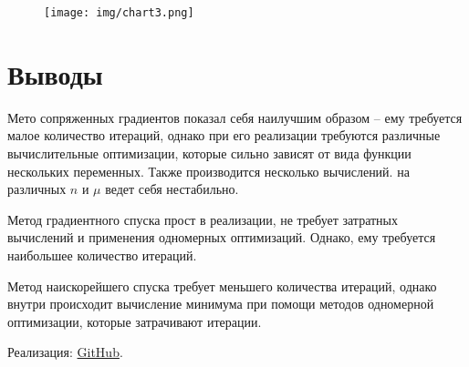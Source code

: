 \documentclass[12pt]{article}
\begin{document}
\begin{figure}[h]
	\centering
	\texttt{[image: img/chart3.png]}
\end{figure}

\newpage
\section{Выводы}

Мето сопряженных градиентов показал себя наилучшим образом -- ему требуется малое количество итераций, однако при его реализации требуются различные вычислительные оптимизации, которые сильно зависят от вида функции нескольких переменных. Также производится несколько вычислений. на различных $n$ и $\mu$ ведет себя нестабильно.

Метод градиентного спуска прост в реализации, не требует затратных вычислений и применения одномерных оптимизаций. Однако, ему требуется наибольшее количество итераций.

Метод наискорейшего спуска требует меньшего количества итераций, однако внутри происходит вычисление минимума при помощи методов одномерной оптимизации, которые затрачивают итерации.

Реализация: \href{https://github.com/Mr3zee/ITMO-Optimization-Methods-LAB2-2021/}{GitHub}.
\end{document}
